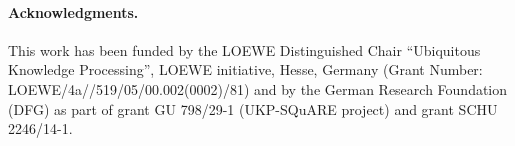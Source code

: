 \paragraph{Acknowledgments.}
This work has been funded by the LOEWE Distinguished Chair
“Ubiquitous Knowledge
Processing”, LOEWE initiative, Hesse, Germany (Grant Number:
LOEWE/4a//519/05/00.002(0002)/81) and by the German Research
Foundation (DFG) as part
of grant GU 798/29-1 (UKP-SQuARE project) and grant SCHU 2246/14-1.
